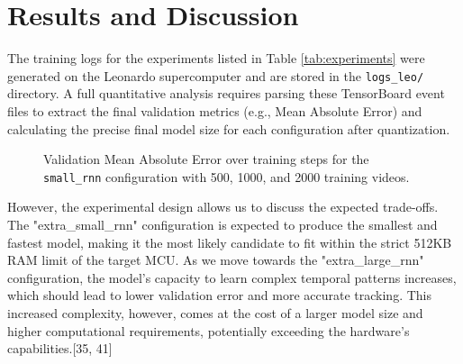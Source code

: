 \documentclass{article}
\begin{document}
\section{Results and Discussion}
The training logs for the experiments listed in Table \ref{tab:experiments} were generated on the Leonardo supercomputer and are stored in the \texttt{logs\_leo/} directory.
A full quantitative analysis requires parsing these TensorBoard event files to extract the final validation metrics (e.g., Mean Absolute Error) and calculating the precise final model size for each configuration after quantization.
\begin{figure}[h!]
\centering
{}
\caption{Validation Mean Absolute Error over training steps for the \texttt{small\_rnn} configuration with 500, 1000, and 2000 training videos.}
\label{fig:validation_mae_small_rnn}
\end{figure}

However, the experimental design allows us to discuss the expected trade-offs.
The "extra\_small\_rnn" configuration is expected to produce the smallest and fastest model, making it the most likely candidate to fit within the strict 512KB RAM limit of the target MCU.
As we move towards the "extra\_large\_rnn" configuration, the model's capacity to learn complex temporal patterns increases, which should lead to lower validation error and more accurate tracking.
This increased complexity, however, comes at the cost of a larger model size and higher computational requirements, potentially exceeding the hardware's capabilities.[35, 41]
\end{document}
